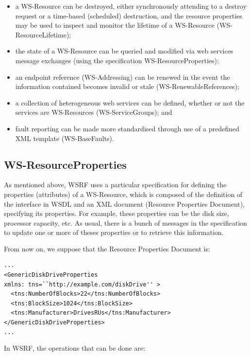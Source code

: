\begin{itemize}
\item a WS-Resource can be destroyed, either synchronously attending to a
destroy request or a time-based (scheduled)
destruction, and the resource properties may be used to inspect and monitor the lifetime of a WS-Resource (WS-ResourceLifetime);
\item the state of  a WS-Resource 
can be queried and modified via web services
message exchanges (using the specification WS-ResourceProperties);
\item an endpoint reference (WS-Addressing) can be renewed in the
event the information contained becomes invalid
or stale (WS-RenewableReferences);
\item a collection of heterogeneous web services can be defined,
whether or not the services are WS-Resources (WS-ServiceGroups); and 
\item fault reporting can be made more standardised through use of a predefined XML
template (WS-BaseFaults). 
\end{itemize} 

\subsection{WS-ResourceProperties}

As mentioned above, WSRF uses a particular specification 
for defining the properties (attributes) of a WS-Resource, which is composed of 
the definition of the interface in WSDL and an XML document (Resource Properties Document), 
specifying its properties. For example, these properties can be the disk size, processor capacity, etc.
As usual, there is a bunch of messages in the specification to update one or more of theses properties or to retrieve this
information. 

From now on, we suppose that the Resource Properties Document is:

\lstset{language=XML, numbersep=5pt,basicstyle=\small, frame=single}
\begin{lstlisting}
...
<GenericDiskDriveProperties 
xmlns: tns=``http://example.com/diskDrive'' >
  <tns:NumberOfBlocks>22</tns:NumberOfBlocks>
  <tns:BlockSize>1024</tns:BlockSize>
  <tns:Manufacturer>DrivesRUs</tns:Manufacturer>
</GenericDiskDriveProperties>
...
\end{lstlisting}

In WSRF, the operations that can be done are:

